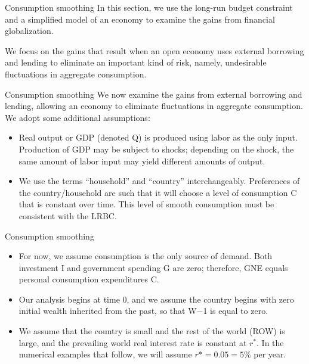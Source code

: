\documentclass[
  ignorenonframetext,
]{beamer}
\begin{document}
\begin{frame}{Consumption smoothing}
\label{consumption-smoothing}
In this section, we use the long-run budget constraint and a simplified
model of an economy to examine the gains from financial globalization.

We focus on the gains that result when an open economy uses external
borrowing and lending to eliminate an important kind of risk, namely,
undesirable fluctuations in aggregate consumption.
\end{frame}

\begin{frame}{Consumption smoothing}
\label{consumption-smoothing-1}
We now examine the gains from external borrowing and lending, allowing
an economy to eliminate fluctuations in aggregate consumption. We adopt
some additional assumptions:

\begin{itemize}
\item
  Real output or GDP (denoted Q) is produced using labor as the only
  input. Production of GDP may be subject to shocks; depending on the
  shock, the same amount of labor input may yield different amounts of
  output.
\item
  We use the terms ``household'' and ``country'' interchangeably.
  Preferences of the country/household are such that it will choose a
  level of consumption C that is constant over time. This level of
  smooth consumption must be consistent with the LRBC.
\end{itemize}
\end{frame}

\begin{frame}{Consumption smoothing}
\label{consumption-smoothing-2}
\begin{itemize}
\item
  For now, we assume consumption is the only source of demand. Both
  investment I and government spending G are zero; therefore, GNE equals
  personal consumption expenditures C.
\item
  Our analysis begins at time 0, and we assume the country begins with
  zero initial wealth inherited from the past, so that W−1 is equal to
  zero.
\item
  We assume that the country is small and the rest of the world (ROW) is
  large, and the prevailing world real interest rate is constant at
  \(r^*\). In the numerical examples that follow, we will assume
  \(r* = 0.05 = 5\%\) per year.
\end{itemize}
\end{frame}
\end{document}
